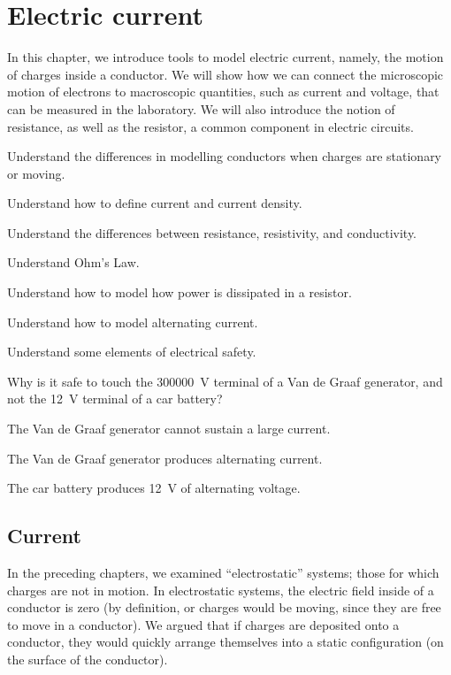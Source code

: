 \chapter{Electric current}
\label{chapter:current}
In this chapter, we introduce tools to model electric current, namely, the motion of charges inside a conductor. We will show how we can connect the microscopic motion of electrons to macroscopic quantities, such as current and voltage, that can be measured in the laboratory. We will also introduce the notion of resistance, as well as the resistor, a common component in electric circuits.
\begin{learningObjectives}{
 \item Understand the differences in modelling conductors when charges are stationary or moving.
 \item Understand how to define current and current density.
 \item Understand the differences between resistance, resistivity, and conductivity.
 \item Understand Ohm's Law.
 \item Understand how to model how power is dissipated in a resistor.
 \item Understand how to model alternating current.
 \item Understand some elements of electrical safety.
 }
\end{learningObjectives}

\begin{opening}
\begin{MCquestion}{Why is it safe to touch the \SI{300000}{V} terminal of a Van de Graaf generator, and not the \SI{12}{V} terminal of a car battery?}
\item The Van de Graaf generator cannot sustain a large current. \correct
\item The Van de Graaf generator produces alternating current.
\item The car battery produces \SI{12}{V} of alternating voltage.
\end{MCquestion}
\end{opening}

\section{Current}
In the preceding chapters, we examined ``electrostatic'' systems; those for which charges are not in motion. In electrostatic systems, the electric field inside of a conductor is zero (by definition, or charges would be moving, since they are free to move in a conductor). We argued that if charges are deposited onto a conductor, they would quickly arrange themselves into a static configuration (on the surface of the conductor).

